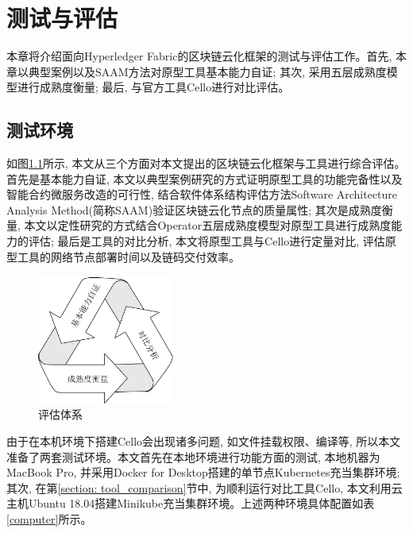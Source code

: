 \chapter{测试与评估}

本章将介绍面向Hyperledger Fabric的区块链云化框架的测试与评估工作。首先, 本章以典型案例以及SAAM方法对原型工具基本能力自证; 其次, 采用五层成熟度模型进行成熟度衡量; 最后, 与官方工具Cello\footnotemark[1]进行对比评估。



\section{测试环境}

如图\ref{assessment}所示, 本文从三个方面对本文提出的区块链云化框架与工具进行综合评估。首先是基本能力自证, 本文以典型案例研究的方式证明原型工具的功能完备性以及智能合约微服务改造的可行性, 结合软件体系结构评估方法Software Architecture Analysis Method(简称SAAM)验证区块链云化节点的质量属性; 其次是成熟度衡量, 本文以定性研究\cite{tashakkori1998mixed}的方式结合Operator五层成熟度模型对原型工具进行成熟度能力的评估; 最后是工具的对比分析, 本文将原型工具与Cello进行定量对比, 评估原型工具的网络节点部署时间以及链码交付效率。

\begin{figure}[h] %
    \centering %
    \includegraphics[width=0.4\textwidth]{FIGs/chapter6/assessment.pdf} %
    \caption{评估体系} %
    \label{assessment} %
\end{figure}%

由于在本机环境下搭建Cello会出现诸多问题, 如文件挂载权限、编译等, 所以本文准备了两套测试环境。本文首先在本地环境进行功能方面的测试, 本地机器为MacBook Pro, 并采用Docker for Desktop搭建的单节点Kubernetes充当集群环境; 其次, 在第\ref{section: tool_comparison}节中, 为顺利运行对比工具Cello, 本文利用云主机Ubuntu 18.04搭建Minikube充当集群环境。上述两种环境具体配置如表\ref{computer}所示。

